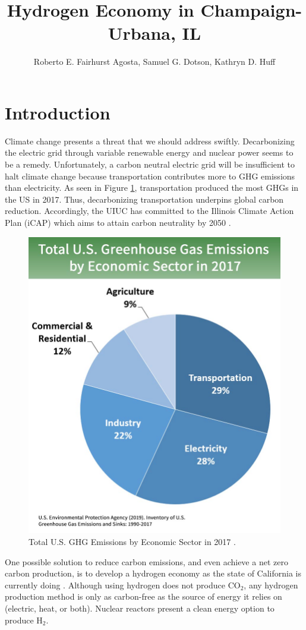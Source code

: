 \documentclass{anstrans}
\title{Hydrogen Economy in Champaign-Urbana, IL}
\author{Roberto E. Fairhurst Agosta, Samuel G. Dotson, Kathryn D. Huff}
\institute{
University of Illinois at Urbana-Champaign, Dept. of Nuclear, Plasma, and Radiological Engineering\\
ref3@illinois.edu
}
\begin{document}
\section{Introduction}

Climate change presents a threat that we should address swiftly. Decarbonizing the electric grid through variable renewable energy and nuclear power seems to be a remedy. Unfortunately, a carbon neutral electric grid will be insufficient to halt climate change because transportation contributes more to \gls{GHG} emissions than electricity. As seen in Figure \ref{fig:ghg}, transportation produced the most \glspl{GHG} in the US in 2017. Thus, decarbonizing transportation underpins global carbon reduction. Accordingly, the \gls{UIUC} has committed to the Illinois Climate Action Plan (iCAP) which aims to attain carbon neutrality by 2050 \cite{university_of_illinois_at_urbana-champaign_illlinois_2015}.

\begin{figure}[H]
	\centering
	\includegraphics[width=0.7\linewidth]{figures/total-ghg-2019-caption.jpg}
	\hfill
	\caption{Total U.S. GHG Emissions by Economic Sector in 2017 \cite{us_epa_sources_2020}.}
	\label{fig:ghg}
\end{figure}

One possible solution to reduce carbon emissions, and even achieve a net zero carbon production, is to develop a hydrogen economy as the state of California is currently doing \cite{brown_economic_2013}. 
Although using hydrogen does not produce CO$_2$, any hydrogen production method is only as carbon-free as the source of energy it relies on (electric, heat, or both).
Nuclear reactors present a clean energy option to produce H$_2$.
\end{document}
